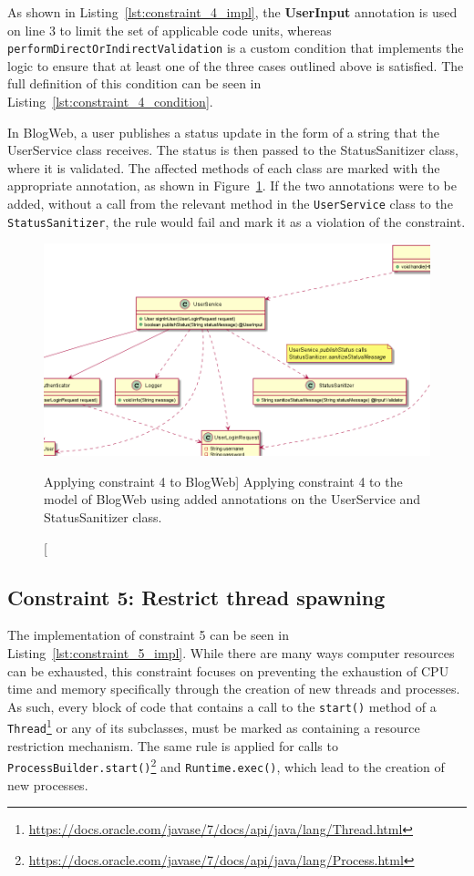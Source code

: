 As shown in Listing~\ref{lst:constraint_4_impl}, the \textbf{UserInput} annotation is used on line 3 to limit the set of applicable code units, whereas \texttt{performDirectOrIndirect\-Validation} is a custom condition that implements the logic to ensure that at least one of the three cases outlined above is satisfied. The full definition of this condition can be seen in Listing~\ref{lst:constraint_4_condition}.

In BlogWeb, a user publishes a status update in the form of a string that the UserService class receives. The status is then passed to the StatusSanitizer class, where it is validated. The affected methods of each class are marked with the appropriate annotation, as shown in Figure~\ref{fig:validate_input_toy_system}. If the two annotations were to be added, without a call from the relevant method in the \texttt{UserService} class to the \texttt{StatusSanitizer}, the rule would fail and mark it as a violation of the constraint.

\begin{figure}
    \centering
    \includegraphics[width=\textwidth]{figure/toyexamples/validate_input_toy_system.png}
    \caption
        [Applying constraint 4 to BlogWeb]
        {Applying constraint 4 to the model of BlogWeb using added annotations on the UserService and StatusSanitizer class.}
    \label{fig:validate_input_toy_system}
\end{figure}

\subsection{Constraint 5: Restrict thread spawning}
The implementation of constraint 5 can be seen in Listing~\ref{lst:constraint_5_impl}.
While there are many ways computer resources can be exhausted, this constraint focuses on preventing the exhaustion of CPU time and memory specifically through the creation of new threads and processes. As such, every block of code that contains a call to the \texttt{start()} method of a \texttt{Thread}\footnote{\url{https://docs.oracle.com/javase/7/docs/api/java/lang/Thread.html}} or any of its subclasses, must be marked as containing a resource restriction mechanism. The same rule is applied for calls to \texttt{ProcessBuilder.start()}\footnote{\url{https://docs.oracle.com/javase/7/docs/api/java/lang/Process.html}\label{fnt:java_process}} and \texttt{Runtime.exec()}, which lead to the creation of new processes.

